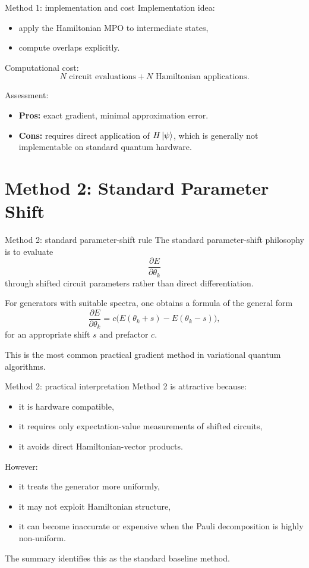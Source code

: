 \documentclass[aspectratio=169]{beamer}
\begin{document}
\begin{frame}{Method 1: implementation and cost}
Implementation idea:
\begin{itemize}
\item apply the Hamiltonian MPO to intermediate states,
\item compute overlaps explicitly.
\end{itemize}

Computational cost:
\[
N \text{ circuit evaluations} + N \text{ Hamiltonian applications}.
\]

Assessment:
\begin{itemize}
\item \textbf{Pros:} exact gradient, minimal approximation error.
\item \textbf{Cons:} requires direct application of \(H\ket{\psi}\), which is generally not implementable on standard quantum hardware.
\end{itemize}
\end{frame}

\section{Method 2: Standard Parameter Shift}

\begin{frame}{Method 2: standard parameter-shift rule}
The standard parameter-shift philosophy is to evaluate
\[
\frac{\partial E}{\partial \theta_k}
\]
through shifted circuit parameters rather than direct differentiation.

For generators with suitable spectra, one obtains a formula of the general form
\[
\frac{\partial E}{\partial \theta_k}
=
c\Big(E(\theta_k+s)-E(\theta_k-s)\Big),
\]
for an appropriate shift \(s\) and prefactor \(c\).

This is the most common practical gradient method in variational quantum algorithms.
\end{frame}

\begin{frame}{Method 2: practical interpretation}
Method 2 is attractive because:
\begin{itemize}
\item it is hardware compatible,
\item it requires only expectation-value measurements of shifted circuits,
\item it avoids direct Hamiltonian-vector products.
\end{itemize}

However:
\begin{itemize}
\item it treats the generator more uniformly,
\item it may not exploit Hamiltonian structure,
\item it can become inaccurate or expensive when the Pauli decomposition is highly non-uniform.
\end{itemize}

The summary identifies this as the standard baseline method.
\end{frame}
\end{document}
